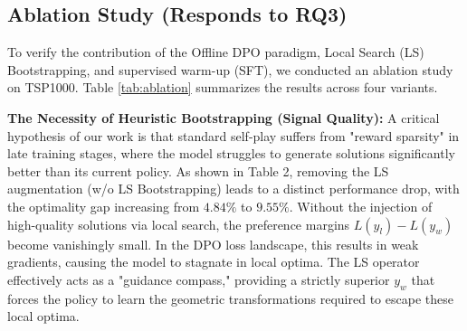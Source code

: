 \documentclass{article}
\theoremstyle{plain}
\theoremstyle{definition}
\theoremstyle{remark}
\begin{document}
\subsection{Ablation Study (Responds to RQ3)}
\begin{table}[t]
    \caption{Ablation study on TSP1000. We report the average Optimality Gap (Gap) relative to the ground truth and the Total Training Time. ``--'' indicates that the model failed to converge or exhibited instability. The best results are highlighted in \textbf{bold}.}
    \vspace{-5pt}
    \label{tab:ablation}
    \begin{center}
    \begin{small}
    \begin{sc}
    \end{sc}
    \end{small}
    \end{center}
    \vspace{-25pt}
\end{table}
To verify the contribution of the Offline DPO paradigm, Local Search (LS) Bootstrapping, and supervised warm-up (SFT), we conducted an ablation study on TSP1000. Table \ref{tab:ablation} summarizes the results across four variants.






\textbf{The Necessity of Heuristic Bootstrapping (Signal Quality):} A critical hypothesis of our work is that standard self-play suffers from "reward sparsity" in late training stages, where the model struggles to generate solutions significantly better than its current policy. As shown in Table 2, removing the LS augmentation (w/o LS Bootstrapping) leads to a distinct performance drop, with the optimality gap increasing from $4.84\%$ to $9.55\%$. Without the injection of high-quality solutions via local search, the preference margins $L(y_l) - L(y_w)$ become vanishingly small. In the DPO loss landscape, this results in weak gradients, causing the model to stagnate in local optima. The LS operator effectively acts as a "guidance compass," providing a strictly superior $y_w$ that forces the policy to learn the geometric transformations required to escape these local optima.
\end{document}
